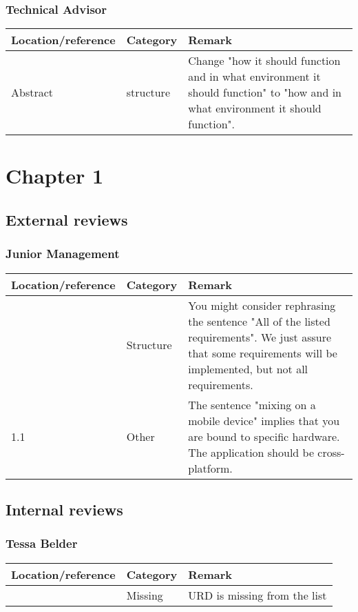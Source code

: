 \newpage

\subsubsection*{Technical Advisor}
\begin{longtable}{l|l|p{}}
Location/reference & Category & Remark\\
\hline
\hline
\endhead
\hline
\endfoot
Abstract & structure & Change "how it should function and in what environment it should function" to "how and in what environment it should function". \\
\end{longtable}

\section{Chapter 1}
\subsection{External reviews}
\subsubsection*{Junior Management}
\begin{longtable}{l|l|p{}}
Location/reference & Category & Remark\\
\hline
\hline
\endhead
\hline
\endfoot
1.1 & Structure & You might consider rephrasing the sentence "All of the listed requirements". We just assure that some requirements will be implemented, but not all requirements. \\
1.1 & Other & The sentence "mixing on a mobile device" implies that you are bound to specific hardware. The application should be cross-platform. \\
\end{longtable}

\subsection{Internal reviews}
\subsubsection*{Tessa Belder}

\begin{longtable}{l|l|p{}}
Location/reference & Category & Remark\\
\hline
\hline
\endhead
\hline
\endfoot
1.3 & Missing & URD is missing from the list
\end{longtable}


